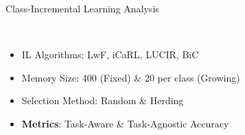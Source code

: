 \documentclass[aspectratio=169, xcolor=dvipsnames]{beamer}
\begin{document}
\begin{frame}{Class-Incremental Learning Analysis}
      \framesubtitle{}%
      
      \vspace{-0.15cm}
      \begin{columns}
      \vspace{-0.75cm}
      \begin{itemize}
            \item IL Algorithms: LwF\footnotemark[4], iCaRL\footnotemark[5], LUCIR\footnotemark[6], BiC\footnotemark[7]
            \item Memory Size: 400 (Fixed) \& 20 per class (Growing)
            \item Selection Method: Random \& Herding
            \item \textbf{Metrics}: Task-Aware \& Task-Agnostic Accuracy
      \end{itemize}
      

\end{columns}
\end{frame}
\end{document}
